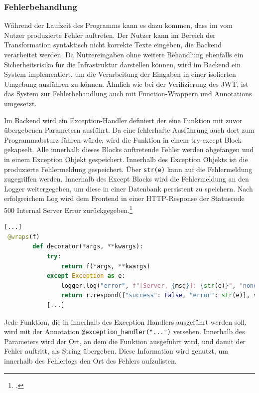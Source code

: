 \subsubsection{Fehlerbehandlung}
Während der Laufzeit des Programms kann es dazu kommen, dass im vom Nutzer produzierte Fehler auftreten. Der Nutzer kann im Bereich der Transformation syntaktisch nicht korrekte Texte eingeben, die Backend verarbeitet werden. Da Nutzereingaben ohne weitere Behandlung ebenfalls ein Sicherheitsrisiko für die Infrastruktur darstellen können, wird im Backend ein System implementiert, um die Verarbeitung der Eingaben in einer isolierten Umgebung ausführen zu können. Ähnlich wie bei der Verifizierung des JWT, ist das System zur Fehlerbehandlung auch mit Function-Wrappern und Annotations umgesetzt. 

Im Backend wird ein Exception-Handler definiert der eine Funktion mit zuvor übergebenen Parametern ausführt. Da eine fehlerhafte Ausführung auch dort zum Programmabsturz führen würde, wird die Funktion in einem try-except Block gekapselt. Alle innerhalb dieses Blocks auftretende Fehler werden abgefangen und in einem Exception Objekt gespeichert. Innerhalb des Exception Objekts ist die produzierte Fehlermeldung gespeichert. Über \texttt{str(e)} kann auf die Fehlermeldung zugegriffen werden. Innerhalb des Except Blocks wird die Fehlermeldung an den Logger weitergegeben, um diese in einer Datenbank persistent zu speichern. Nach erfolgreichem Log wird dem Frontend in einer HTTP-Response der Statuscode 500 \glqq Internal Server Error\grqq{} zurückgegeben.\footcite{fielding1999rfc2616}

\begin{lstlisting}[language=Python, caption={Exception-Handling mithilfe von Wrappern}]
[...]
 @wraps(f)
        def decorator(*args, **kwargs):
            try:
                return f(*args, **kwargs)
            except Exception as e:
                logger.log("error", f"[Server, {msg}]: {str(e)}", "none")
                return r.respond({"success": False, "error": str(e)}, status=500)
            [...]
\end{lstlisting}

Jede Funktion, die in innerhalb des Exception Handlers ausgeführt werden soll, wird mit der Annotation \texttt{@exception\_{}handler("...")} versehen. Innerhalb des Parameters wird der Ort, an dem die Funktion ausgeführt wird, und damit der Fehler auftritt, als String übergeben. Diese Information wird genutzt, um innerhalb des Fehlerlogs den Ort des Fehlers aufzulisten.

